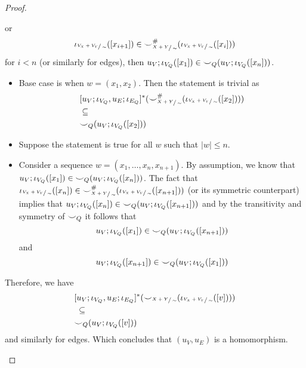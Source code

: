 \begin{proof}
\begin{enumerate}
\begin{itemize}
        or 
        \[
            \iota_{\sfrac{V_{X} + V_{Y}}{\sim}}([x_{i+1}]) \in {\smile}_{\sfrac{X+Y}{\sim}}^{{\#}}(\iota_{\sfrac{V_{X} + V_{Y}}{\sim}}([x_{i}]))
        \]
        for $i < n$ (or similarly for edges), then $u_{V};\iota_{V_{Q}}([x_1]) \in {\smile}_{Q}(u_{V};\iota_{V_{Q}}([x_n]))$.
        \begin{itemize}
            \item Base case is when $w = (x_1,x_2)$.
                  Then the statement is trivial as 
                  \begin{align*}
                  &[u_{V};\iota_{V_{Q}},u_{E};\iota_{E_{Q}}]^{*}({\smile}_{\sfrac{X+Y}{\sim}}^{{\#}}(\iota_{\sfrac{V_{X} + V_{Y}}{\sim}}([x_2])))\\
                  &\subseteq\\
                  &{\smile}_{Q}(u_{V};\iota_{V_{Q}}([x_2]))
                  \end{align*}
            \item Suppose the statement is true for all $w$ such that $|w| \leq n$.
            \item Consider a sequence $w = (x_1, \ldots, x_{n}, x_{n+1})$.
                  By assumption, we know that $u_{V};\iota_{V_{Q}}([x_1]) \in {\smile}_{Q}(u_{V};\iota_{V_{Q}}([x_n]))$.
                  The fact that $\iota_{\sfrac{V_{X} + V_{Y}}{\sim}}([x_{n}]) \in {\smile}_{\sfrac{X+Y}{\sim}}^{{\#}}(\iota_{\sfrac{V_{X} + V_{Y}}{\sim}}([x_{n+1}]))$ (or its symmetric counterpart) implies that $u_{V};\iota_{V_{Q}}([x_{n}]) \in {\smile}_{Q}(u_{V};\iota_{V_{Q}}([x_{n+1}]))$ and by the transitivity and symmetry of ${\smile}_{Q}$ it follows that
                \[
                    u_{V};\iota_{V_{Q}}([x_1]) \in {\smile}_{Q}(u_{V};\iota_{V_{Q}}([x_{n+1}]))
                \]
                and
                \[
                    u_{V};\iota_{V_{Q}}([x_{n+1}]) \in {\smile}_{Q}(u_{V};\iota_{V_{Q}}([x_{1}]))
                \]
        \end{itemize}
       \end{itemize}
       Therefore, we have
       \begin{align*}
        &[u_{V};\iota_{V_{Q}}, u_{E};\iota_{E_{Q}}]^{*}({\smile}_{\sfrac{X+Y}{\sim}}(\iota_{\sfrac{V_{X} + V_{Y}}{\sim}}([v])))\\
        &\;\subseteq\\
        &{\smile}_{Q}(u_{V};\iota_{V_{Q}}([v]))
       \end{align*}
       and similarly for edges. Which concludes that $(u_{V},u_{E})$ is a homomorphism.
    \end{enumerate}
\end{proof}


